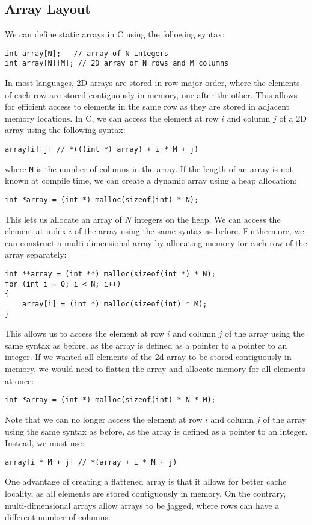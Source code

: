 \documentclass{article}
\begin{document}
\subsection{Array Layout}
We can define static arrays in C using the following syntax:
\begin{verbatim}
int array[N];   // array of N integers
int array[N][M]; // 2D array of N rows and M columns
\end{verbatim}
In most languages, 2D arrays are stored in row-major order, where the
elements of each row are stored contiguously in memory, one after the
other. This allows for efficient access to elements in the same row as
they are stored in adjacent memory locations. In C, we can access the
element at row \(i\) and column \(j\) of a 2D array using the following
syntax:
\begin{verbatim}
array[i][j] // *(((int *) array) + i * M + j)
\end{verbatim}
where \texttt{M} is the number of columns in the array. If the
length of an array is not known at compile time, we can create a
dynamic array using a heap allocation:
\begin{verbatim}
int *array = (int *) malloc(sizeof(int) * N);
\end{verbatim}
This lets us allocate an array of \(N\) integers on the heap. We can
access the element at index \(i\) of the array using the same syntax as
before. Furthermore, we can construct a multi-dimensional array by
allocating memory for each row of the array separately:
\begin{verbatim}
int **array = (int **) malloc(sizeof(int *) * N);
for (int i = 0; i < N; i++)
{
    array[i] = (int *) malloc(sizeof(int) * M);
}
\end{verbatim}
This allows us to access the element at row \(i\) and column \(j\) of
the array using the same syntax as before, as the array is defined as a
pointer to a pointer to an integer. If we wanted all elements of the 2d
array to be stored contiguously in memory, we would need to flatten the
array and allocate memory for all elements at once:
\begin{verbatim}
int *array = (int *) malloc(sizeof(int) * N * M);
\end{verbatim}
Note that we can no longer access the element at row \(i\) and column
\(j\) of the array using the same syntax as before, as the array is
defined as a pointer to an integer. Instead, we must use:
\begin{verbatim}
array[i * M + j] // *(array + i * M + j)
\end{verbatim}
One advantage of creating a flattened array is that it allows for
better cache locality, as all elements are stored contiguously in
memory. On the contrary, multi-dimensional arrays allow arrays to be
jagged, where rows can have a different number of columns.
\end{document}
